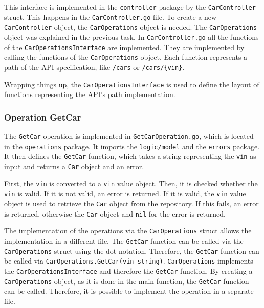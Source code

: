 This interface is implemented in the \texttt{controller} package by the \texttt{CarController} struct.
This happens in the \texttt{CarController.go} file.
To create a new \texttt{CarController} object, the \texttt{CarOperations} object is needed.
The \texttt{CarOperations} object was explained in the previous task.
In \texttt{CarController.go} all the functions of the \texttt{CarOperationsInterface} are implemented.
They are implemented by calling the functions of the \texttt{CarOperations} object.
Each function represents a path of the API specification, like \texttt{/cars} or \texttt{/cars/\{vin\}}.

Wrapping things up, the \texttt{CarOperationsInterface} is used to define the layout of functions representing the API's path implementation.

\subsubsection*{Operation GetCar}
The \texttt{GetCar} operation is implemented in \texttt{GetCarOperation.go}, which is located in the \texttt{operations} package.
It imports the \texttt{logic/model} and the \texttt{errors} package.
It then defines the \texttt{GetCar} function, which takes a string representing the \texttt{vin} as input and returns a \texttt{Car} object and an error.

First, the \texttt{vin} is converted to a \texttt{vin} value object.
Then, it is checked whether the \texttt{vin} is valid.
If it is not valid, an error is returned.
If it is valid, the \texttt{vin} value object is used to retrieve the \texttt{Car} object from the repository.
If this fails, an error is returned, otherwise the \texttt{Car} object and \texttt{nil} for the error is returned.

The implementation of the operations via the \texttt{CarOperations} struct allows the implementation in a different file.
The \texttt{GetCar} function can be called via the \texttt{CarOperations} struct using the dot notation.
Therefore, the \texttt{GetCar} function can be called via \hfill \linebreak \texttt{CarOperations.GetCar(vin string)}.
\texttt{CarOperations} implements the \hfill \linebreak \texttt{CarOperationsInterface} and therefore the \texttt{GetCar} function.
By creating a \texttt{CarOperations} object, as it is done in the main function, the \texttt{GetCar} function can be called.
Therefore, it is possible to implement the operation in a separate file.


